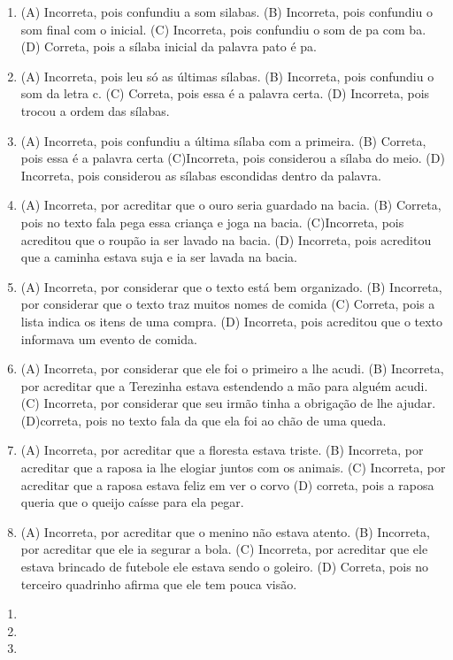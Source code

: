 \begin{enumerate}
\item
(A) Incorreta, pois confundiu a som silabas.
(B) Incorreta, pois confundiu o som final com o inicial.
(C) Incorreta, pois confundiu o som de pa com ba.
(D) Correta, pois a sílaba inicial da palavra pato é pa.

\item
(A) Incorreta, pois leu só as últimas sílabas.
(B) Incorreta, pois confundiu o som da letra c.
(C) Correta, pois essa é a palavra certa.
(D) Incorreta, pois trocou a ordem das sílabas.

\item
(A) Incorreta, pois confundiu a última sílaba com a primeira.
(B) Correta, pois essa é a palavra certa
(C)Incorreta, pois considerou a sílaba do meio.
(D) Incorreta, pois considerou as sílabas escondidas dentro da palavra.

\item
(A) Incorreta, por acreditar que o ouro seria guardado na bacia.
(B) Correta, pois no texto fala pega essa criança e joga na bacia.
(C)Incorreta, pois acreditou que o roupão ia ser lavado na bacia.
(D) Incorreta, pois acreditou que a caminha estava suja e ia ser lavada
na bacia.

\item
(A) Incorreta, por considerar que o texto está bem organizado.
(B) Incorreta, por considerar que o texto traz muitos nomes de comida
(C) Correta, pois a lista indica os itens de uma compra.
(D) Incorreta, pois acreditou que o texto informava um evento de comida.

\item
(A) Incorreta, por considerar que ele foi o primeiro a lhe acudi.
(B) Incorreta, por acreditar que a Terezinha estava estendendo a mão
para alguém acudi.
(C) Incorreta, por considerar que seu irmão tinha a obrigação de lhe
ajudar.
(D)correta, pois no texto fala da que ela foi ao chão de uma queda.

\item
(A) Incorreta, por acreditar que a floresta estava triste.
(B) Incorreta, por acreditar que a raposa ia lhe elogiar juntos com os
animais.
(C) Incorreta, por acreditar que a raposa estava feliz em ver o corvo
(D) correta, pois a raposa queria que o queijo caísse para ela
pegar.

\item
(A) Incorreta, por acreditar que o menino não estava atento.
(B) Incorreta, por acreditar que ele ia segurar a bola.
(C) Incorreta, por acreditar que ele estava brincado de futebole ele
estava sendo o goleiro.
(D) Correta, pois no terceiro quadrinho afirma que ele tem pouca visão.
\end{enumerate}


\begin{enumerate}
\item

\item

\item
\end{enumerate}
